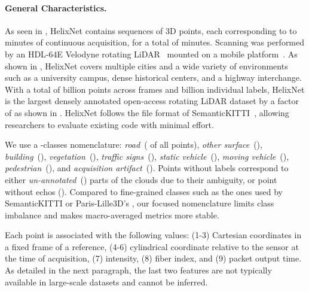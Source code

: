 \documentclass[runningheads]{tpls/llncs}
\begin{document}
\paragraph{General Characteristics.}
As seen in , HelixNet contains  sequences of 3D points, each corresponding to  to  minutes of continuous acquisition, for a total of  minutes. Scanning was performed by an HDL-64E Velodyne rotating LiDAR~\cite{velodyne} mounted on a mobile platform~\cite{stereopolis}. 
As shown in , HelixNet covers multiple cities and a wide variety of environments such as a university campus, dense historical centers, and a highway interchange.
With a total of  billion points across  frames and  billion individual labels, HelixNet is the largest densely annotated open-access rotating LiDAR dataset by a factor of  as shown in . HelixNet follows the file format of SemanticKITTI~\cite{behley2019iccv}, allowing researchers to evaluate existing code with minimal effort.

We use a -classes nomenclature: \emph{road}~( of all points), \emph{other surface}~(), \emph{building}~(), \emph{vegetation}~(), \emph{traffic signs}~(), \emph{static vehicle}~(), \emph{moving vehicle}~(), \emph{pedestrian}~(), and \emph{acquisition artifact}~(). 
Points without labels correspond to either \emph{un-annotated}~() parts of the clouds due to their ambiguity, or point without echos ().
Compared to fine-grained classes such as the ones used by SemanticKITTI \cite{behley2019iccv} or Paris-Lille3D's \cite{roynard2017parislille3d}, our focused nomenclature limits class imbalance and makes macro-averaged metrics more stable.

Each point is associated with the  following values: (1-3) Cartesian coordinates in a fixed frame of a reference, (4-6) cylindrical coordinate relative to the sensor at the time of acquisition, (7) intensity, (8) fiber index, and (9) packet output time. As detailed in the next paragraph, the last two features are not typically available in large-scale datasets and cannot be inferred. 
\end{document}

